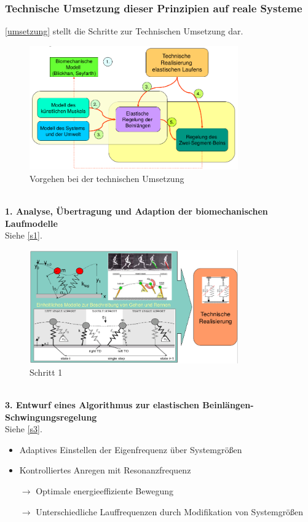 \subsubsection{Technische Umsetzung dieser Prinzipien auf reale Systeme}
\autoref{umsetzung} stellt die Schritte zur Technischen Umsetzung dar.
\begin{figure}[h!]
	\centering
	\includegraphics[width=0.8\textwidth]{figures/ch06_umsetzung.png}
	\caption{Vorgehen bei der technischen Umsetzung}
	\label{umsetzung}
\end{figure}\\
\textbf{1. Analyse, Übertragung und Adaption der biomechanischen Laufmodelle}\\
Siehe \autoref{s1}.
\begin{figure}[h!]
	\centering
	\includegraphics[width=0.8\textwidth]{figures/ch06_tu1.png}
	\caption{Schritt 1}
	\label{s1}
\end{figure}\\
\textbf{3. Entwurf eines Algorithmus zur elastischen Beinlängen-Schwingungsregelung}\\
Siehe \autoref{s3}.
\begin{itemize}
\item Adaptives Einstellen der Eigenfrequenz über Systemgrößen
\item Kontrolliertes Anregen mit Resonanzfrequenz
\item[$\rightarrow$] Optimale energieeffiziente Bewegung
\item[$\rightarrow$] Unterschiedliche Lauffrequenzen durch Modifikation von Systemgrößen
\end{itemize}
